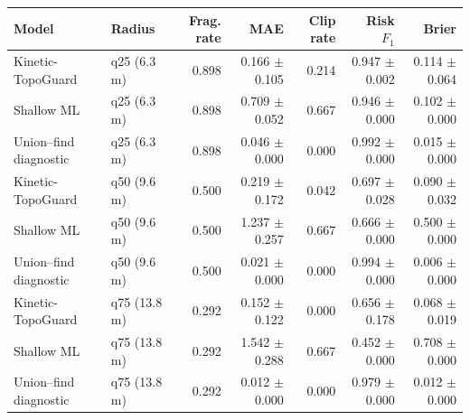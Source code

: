 \begin{tabular}{llrrrrr}
\toprule
Model & Radius & Frag. rate & MAE & Clip rate & Risk $F_1$ & Brier \\
\midrule
Kinetic-TopoGuard & q25 (6.3 m) & 0.898 & 0.166 $\pm$ 0.105 & 0.214 & 0.947 $\pm$ 0.002 & 0.114 $\pm$ 0.064 \\
Shallow ML & q25 (6.3 m) & 0.898 & 0.709 $\pm$ 0.052 & 0.667 & 0.946 $\pm$ 0.000 & 0.102 $\pm$ 0.000 \\
Union--find diagnostic & q25 (6.3 m) & 0.898 & 0.046 $\pm$ 0.000 & 0.000 & 0.992 $\pm$ 0.000 & 0.015 $\pm$ 0.000 \\
Kinetic-TopoGuard & q50 (9.6 m) & 0.500 & 0.219 $\pm$ 0.172 & 0.042 & 0.697 $\pm$ 0.028 & 0.090 $\pm$ 0.032 \\
Shallow ML & q50 (9.6 m) & 0.500 & 1.237 $\pm$ 0.257 & 0.667 & 0.666 $\pm$ 0.000 & 0.500 $\pm$ 0.000 \\
Union--find diagnostic & q50 (9.6 m) & 0.500 & 0.021 $\pm$ 0.000 & 0.000 & 0.994 $\pm$ 0.000 & 0.006 $\pm$ 0.000 \\
Kinetic-TopoGuard & q75 (13.8 m) & 0.292 & 0.152 $\pm$ 0.122 & 0.000 & 0.656 $\pm$ 0.178 & 0.068 $\pm$ 0.019 \\
Shallow ML & q75 (13.8 m) & 0.292 & 1.542 $\pm$ 0.288 & 0.667 & 0.452 $\pm$ 0.000 & 0.708 $\pm$ 0.000 \\
Union--find diagnostic & q75 (13.8 m) & 0.292 & 0.012 $\pm$ 0.000 & 0.000 & 0.979 $\pm$ 0.000 & 0.012 $\pm$ 0.000 \\
\bottomrule
\end{tabular}
